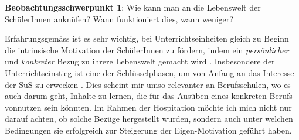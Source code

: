 \begin{myExBox}[title=Beobachtungsschwerpunkt 1]
\textbf{Beobachtungsschwerpunkt 1}: Wie kann man an die Lebenswelt der SchülerInnen anknüfen? Wann funktioniert dies, wann weniger?

Erfahrungsgemäss ist es sehr wichtig, bei Unterrichtseinheiten gleich zu Beginn die intrinsische Motivation der SchülerInnen zu fördern, indem ein \textit{persönlicher} und \textit{konkreter} Bezug zu ihrere Lebenswelt gemacht wird \cite{kaiser}. Insbesondere der Unterrichtseinstieg ist eine der Schlüsselphasen, um von Anfang an das Interesse der SuS zu erwecken \cite{roth, grell}. Dies scheint mir umso relevanter an Berufsschulen, wo es auch darum geht, Inhalte zu lernen, die für das Ausüben eines konkreten Berufs vonnutzen sein könnten. Im Rahmen der Hospitation möchte ich mich nicht nur darauf achten, ob solche Bezüge hergestellt wurden, sondern auch unter welchen Bedingungen sie erfolgreich zur Steigerung der Eigen-Motivation geführt haben. 
\end{myExBox}
